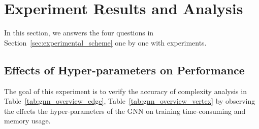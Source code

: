 \section{Experiment Results and Analysis}
\label{sec:experiment_results}

In this section, we answers the four questions in Section~\ref{sec:experimental_scheme} one by one with experiments.

\subsection{Effects of Hyper-parameters on Performance}
\label{sec:effects_of_hyper-parameters_on_performance}

The goal of this experiment is to verify the accuracy of complexity analysis in Table~\ref{tab:gnn_overview_edge}, Table~\ref{tab:gnn_overview_vertex} 
by observing the effects the hyper-parameters of the GNN on training time-consuming and memory usage.

